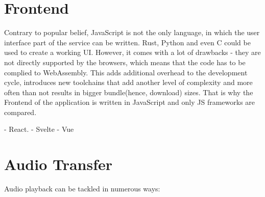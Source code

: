 \section{Frontend}
Contrary to popular belief, JavaScript is not the only language, in which the user interface part
of the service can be written. Rust, Python and even C could be used to create a working UI.
However, it comes with a lot of drawbacks - they are not directly supported by the browsers, which
means that the code has to be complied to WebAssembly. This adds
additional overhead to the development cycle, introduces new toolchains that add another level of
complexity and more often than not results in bigger bundle(hence, download) sizes.
That is why the Frontend of the application is written in JavaScript and only JS frameworks are
compared.

- React.
- Svelte
- Vue


\section{Audio Transfer}
Audio playback can be tackled in numerous ways:

